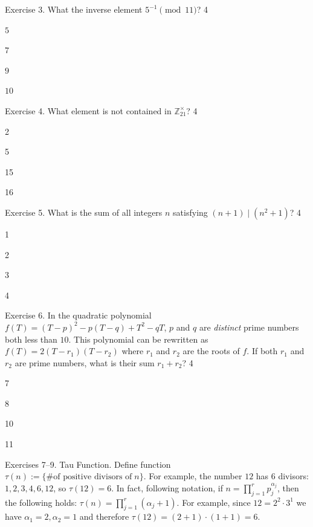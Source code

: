 \documentclass[../../book.tex]{subfiles}
\begin{document}
\begin{xexercise}
    {Exercise 3.}
    {What the inverse element $5^{-1} \pmod{11}$?}
    {4}
    {
        \item $5$
        \item $7$
        \item $9$
        \item $10$
    }
\end{xexercise}

\begin{xexercise}
    {Exercise 4.}
    {What element is not contained in $\mathbb{Z}_{21}^{\times}$?}
    {4}
    {
        \item 2 
        \item 5
        \item 15
        \item 16
    }
\end{xexercise}

\begin{xexercise}
    {Exercise 5.}
    {What is the sum of all integers $n$ satisfying $(n + 1) \mid (n^2 + 1)$?}
    {4}
    {
        \item 1
        \item 2
        \item 3
        \item 4
    }
\end{xexercise}

\begin{xexercise}
    {Exercise 6.} { In the quadratic polynomial $f(T) = (T-p)^2-p(T-q)+T^2-qT$,
    $p$ and $q$ are \emph{distinct} prime numbers both less than $10$. This
    polynomial can be rewritten as $f(T) = 2(T-r_1)(T-r_2)$ where $r_1$ and
    $r_2$ are the roots of $f$. If both $r_1$ and $r_2$ are prime numbers, what
    is their sum $r_1+r_2$? } {4} {
        \item 7
        \item 8
        \item 10
        \item 11
    }
\end{xexercise}

\begin{exbox}{Exercises 7--9. Tau Function.}
Define function $\tau(n) := \{\text{\#
of positive divisors of}\; n\}$. For example, the number $12$ has 6 divisors:
$1,2,3,4,6,12$, so $\tau(12)=6$. In fact, following
 notation, if $n=\prod_{j=1}^r
p_j^{\alpha_j}$, then the following holds: $\tau(n) =
\prod_{j=1}^r(\alpha_j + 1)$. For example, since $12=2^2 \cdot 3^1$ we have
$\alpha_1=2,\alpha_2=1$ and therefore $\tau(12)=(2+1)\cdot (1+1)=6$. 
\end{exbox}
\end{document}
